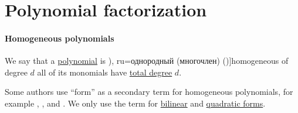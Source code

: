\section{Polynomial factorization}\label{sec:polynomial_factorization}

\paragraph{Homogeneous polynomials}

\begin{definition}\label{def:homogeneous_polynomial}
  We say that a \hyperref[def:polynomial_algebra]{polynomial} is \term[bg=хомогенен (полином) (\cite[58]{ГеновМиховскиМоллов1991Алгебра}), ru=однородный (многочлен) (\cite[314]{Курош1968ВысшаяАлгебра})]{homogeneous} of degree \( d \) all of its monomials have \hyperref[def:polynomial_degree]{total degree} \( d \).
\end{definition}
\begin{comments}
  \item Some authors use \enquote{form} as a secondary term for homogeneous polynomials, for example , ,  and . We only use the term for \hyperref[def:bilinear_form]{bilinear} and \hyperref[def:quadratic_form]{quadratic forms}.
\end{comments}


